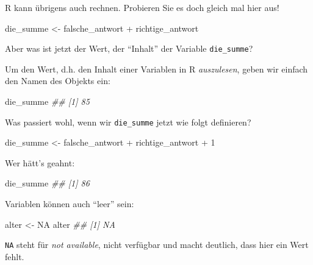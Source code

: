 \documentclass[
  a4paper,
  DIV=11]{scrreprt}
\newenvironment{Shaded}{\begin{snugshade}}{\end{snugshade}}
\newcommand{\ConstantTok}[1]{\textcolor[rgb]{0.56,0.35,0.01}{#1}}
\newcommand{\DecValTok}[1]{\textcolor[rgb]{0.68,0.00,0.00}{#1}}
\newcommand{\DocumentationTok}[1]{\textcolor[rgb]{0.37,0.37,0.37}{\textit{#1}}}
\newcommand{\NormalTok}[1]{\textcolor[rgb]{0.00,0.23,0.31}{#1}}
\newcommand{\OtherTok}[1]{\textcolor[rgb]{0.00,0.23,0.31}{#1}}
\newcommand{\SpecialCharTok}[1]{\textcolor[rgb]{0.37,0.37,0.37}{#1}}
\theoremstyle{definition}
\theoremstyle{definition}
\theoremstyle{definition}
\theoremstyle{remark}
\begin{document}
R kann übrigens auch rechnen. Probieren Sie es doch gleich mal hier aus!

\begin{Shaded}
\begin{Highlighting}[]
\NormalTok{die\_summe }\OtherTok{\textless{}{-}}\NormalTok{ falsche\_antwort }\SpecialCharTok{+}\NormalTok{ richtige\_antwort}
\end{Highlighting}
\end{Shaded}

Aber was ist jetzt der Wert, der ``Inhalt'' der Variable
\texttt{die\_summe}?

Um den Wert, d.h. den Inhalt einer Variablen in R \emph{auszulesen},
geben wir einfach den Namen des Objekts ein:

\begin{Shaded}
\begin{Highlighting}[]
\NormalTok{die\_summe}
\DocumentationTok{\#\# [1] 85}
\end{Highlighting}
\end{Shaded}

Was passiert wohl, wenn wir \texttt{die\_summe} jetzt wie folgt
definieren?

\begin{Shaded}
\begin{Highlighting}[]
\NormalTok{die\_summe }\OtherTok{\textless{}{-}}\NormalTok{ falsche\_antwort }\SpecialCharTok{+}\NormalTok{ richtige\_antwort }\SpecialCharTok{+} \DecValTok{1}
\end{Highlighting}
\end{Shaded}

Wer hätt's geahnt:

\begin{Shaded}
\begin{Highlighting}[]
\NormalTok{die\_summe}
\DocumentationTok{\#\# [1] 86}
\end{Highlighting}
\end{Shaded}

Variablen können auch ``leer'' sein:

\begin{Shaded}
\begin{Highlighting}[]
\NormalTok{alter }\OtherTok{\textless{}{-}} \ConstantTok{NA}
\NormalTok{alter}
\DocumentationTok{\#\# [1] NA}
\end{Highlighting}
\end{Shaded}

\texttt{NA} steht für \emph{not available}, nicht verfügbar und macht
deutlich, dass hier ein Wert fehlt.
\end{document}
